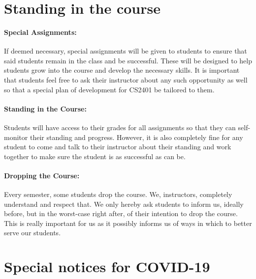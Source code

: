 \documentclass[12pt]{scrartcl}
\begin{document}
\section{Standing in the course}

\paragraph{Special Assignments:} 
If deemed necessary, special assignments will be given to students to ensure that said students remain in the class and be successful. 
These will be designed to help students grow into the course and develop the necessary skills.
It is important that students feel free to ask their instructor about any such opportunity as well so that a special plan of development for CS2401 be tailored to them.

\paragraph{Standing in the Course:} 

Students will have access to their grades for all assignments so that they can self-monitor their standing and progress. 
However, it is also completely fine for any student to come and talk to their instructor about their standing and work together to make sure the student is as successful as can be.

\paragraph{Dropping the Course:} 
Every semester, some students drop the course. We, instructors, completely understand and respect that. We only hereby ask students to inform us, ideally before, but in the worst-case right after, of their intention to drop the course. This is really important for us as it possibly informs us of ways in which to better serve our students.


\section{Special notices for COVID-19}
\end{document}
